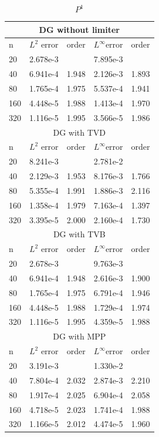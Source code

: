 \documentclass[12pt, a4paper]{ctexart}
\begin{document}
	\begin{table}[htbp]
		\centering
		\caption{$P^1$}
		\begin{tabular}{| p{50pt}<{\centering} | p{60pt}<{\centering} | p{60pt}<{\centering} || p{60pt}<{\centering} | p{60pt}<{\centering}|}
			\hline
			\multicolumn{5}{|c|}{DG without limiter} \\
			\hline
			n & $L^2$ error & order & $L^\infty$error & order \\
			\hline
			20 & 2.678e-3 &  & 7.895e-3 &  \\
			\hline
			40 & 6.941e-4 & 1.948 & 2.126e-3 & 1.893\\
			\hline
			80 & 1.765e-4 & 1.975 & 5.537e-4 & 1.941\\
			\hline
			160 & 4.448e-5 & 1.988 & 1.413e-4 & 1.970\\
			\hline
			320 & 1.116e-5 & 1.995 & 3.566e-5 & 1.986\\
			\hline
			\multicolumn{5}{|c|}{DG with TVD} \\
			\hline
			n & $L^2$ error & order & $L^\infty$error & order \\
			\hline
			20 & 8.241e-3 &  & 2.781e-2 &  \\
			\hline
			40 & 2.129e-3 & 1.953 & 8.176e-3 & 1.766\\
			\hline
			80 & 5.355e-4 & 1.991 & 1.886e-3 & 2.116\\
			\hline
			160 & 1.358e-4 & 1.979 & 7.163e-4 & 1.397\\
			\hline
			320 & 3.395e-5 & 2.000 & 2.160e-4 & 1.730\\
			\hline
			\multicolumn{5}{|c|}{DG with TVB} \\
			\hline
			n & $L^2$ error & order & $L^\infty$error & order \\
			\hline
			20 & 2.678e-3 &  & 9.763e-3 &  \\
			\hline
			40 & 6.941e-4 & 1.948 & 2.616e-3 & 1.900\\
			\hline
			80 & 1.765e-4 & 1.975 & 6.791e-4 & 1.946\\
			\hline
			160 & 4.448e-5 & 1.988 & 1.729e-4 & 1.974\\
			\hline
			320 & 1.116e-5 & 1.995 & 4.359e-5 & 1.988\\
			\hline
			\multicolumn{5}{|c|}{DG with MPP} \\
			\hline
			n & $L^2$ error & order & $L^\infty$error & order \\
			\hline
			20 & 3.191e-3 &  & 1.330e-2 &  \\
			\hline
			40 & 7.804e-4 & 2.032 & 2.874e-3 & 2.210\\
			\hline
			80 & 1.917e-4 & 2.025 & 6.904e-4 & 2.058\\
			\hline
			160 & 4.718e-5 & 2.023 & 1.741e-4 & 1.988\\
			\hline
			320 & 1.166e-5 & 2.012 & 4.474e-5 & 1.960\\
			\hline
		\end{tabular}
	\end{table}
\end{document}
